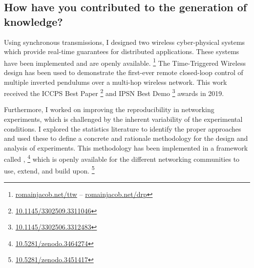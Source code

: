\subsection*{How have you contributed to the generation of knowledge?}


\squarepar
{%
  Using synchronous transmissions, I designed two wireless cyber-physical systems which provide real-time guarantees for distributed applications. These systems have been implemented and are openly available.%
  \footnote{\href{http://www.romainjacob.net/ttw}{romainjacob.net/ttw} -- \href{http://www.romainjacob.net/drp}{romainjacob.net/drp}}
  The Time-Triggered Wireless design has been used to demonstrate the first-ever remote closed-loop control of multiple inverted pendulums over a multi-hop wireless network. This work received the ICCPS Best Paper%
  \footnote{\href{https://doi.org/10.1145/3302509.3311046}{10.1145/3302509.3311046}}
  and IPSN Best Demo%
  \footnote{\href{https://doi.org/10.1145/3302506.3312483}{10.1145/3302506.3312483}}
  awards in 2019.%
}

Furthermore, I worked on improving the reproducibility in networking experiments, which is challenged by the inherent variability of the experimental conditions.
I explored the statistics literature to identify the proper approaches and used these to define a concrete and rationale methodology for the design and analysis of experiments. This methodology has been implemented in a framework called \triscale,%
\footnote{\href{https://doi.org/10.5281/zenodo.3464274}{10.5281/zenodo.3464274}}
%
which is openly available for the different networking communities to use, extend, and build upon.%
\footnote{\href{https://doi.org/10.5281/zenodo.3451417}{10.5281/zenodo.3451417}}

